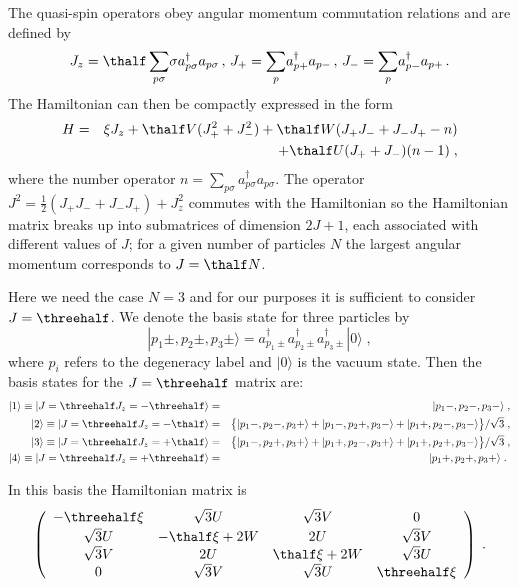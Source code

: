 The
quasi-spin operators obey angular momentum commutation relations and are
defined by
\[
J_z=\thalf\sum_{p\sigma}\!{\sigma}a^{\dagger}_{p\sigma}a_{p\sigma}\,,\,
J_+=\sum_p\!a_{p+}^{\dagger}a_{p-}\,,\,J_-=\sum_p\!a_{p-}^{\dagger}a_{p+}\,.
\]
The Hamiltonian can then be compactly expressed in the form
\begin{eqnarray}
H&=&{\xi}J_z+\thalf V(J_+^2+J_-^2)+\thalf W(J_+J_-+J_-J_+-n)\nonumber\\
&&+\thalf U(J_++J_-)(n-1)\nonumber \;,
\end{eqnarray}
where the number operator $n=\sum_{p\sigma}a^{\dagger}_{p\sigma}
a_{p\sigma}$.
The operator $J^2=\frac{1}{2}(J_+J_-+J_-J_+)+J_z^2$ commutes with the
Hamiltonian so the Hamiltonian matrix breaks up into
submatrices of dimension $2J+1$, each associated with different values of
$J$; for a given number of particles $N$ the largest angular momentum
corresponds to $J=\thalf N$. 

Here we need the case $N=3$ and for our purposes it is sufficient
to consider $J=\threehalf$.
We denote the basis state for three particles by
\[
|p_1\pm,p_2\pm,p_3\pm\rangle=a^\dagger_{p_1\pm}a^\dagger_{p_2\pm}
a^\dagger_{p_3\pm}|0\rangle\;,
\]
where $p_i$ refers to the degeneracy label and $|0\rangle$ is the 
vacuum state. Then the basis states for the $J=\threehalf$ matrix are:
\begin{eqnarray}
|1\rangle\equiv|J=\threehalf J_z=-\threehalf\rangle
&=&|p_1-,p_2-,p_3-\rangle\;,\nonumber\\
|2\rangle\equiv|J=\threehalf J_z=-\thalf\rangle
&=&\bigl\{|p_1-,p_2-,p_3+\rangle
+|p_1-,p_2+,p_3-\rangle+|p_1+,p_2-,p_3-\rangle\bigr\}/\sqrt{3}
\;,\nonumber\\
|3\rangle\equiv|J=\threehalf J_z=+\thalf\rangle
&=&\bigl\{|p_1-,p_2+,p_3+\rangle
+|p_1+,p_2-,p_3+\rangle+|p_1+,p_2+,p_3-\rangle\bigr\}/\sqrt{3}
\;,\nonumber\\
|4\rangle\equiv|J=\threehalf J_z=+\threehalf\rangle
&=&|p_1+,p_2+,p_3+\rangle\nonumber \;.\
\end{eqnarray}

In this basis the Hamiltonian matrix is 
\[
\left(\begin{array}{cccc}
-\threehalf\xi&\sqrt{3}U&\sqrt{3}V&0\\[0.5mm]
\sqrt{3}U&-\thalf\xi+2W&2U&\sqrt{3}V\\
\sqrt{3}V&2U&\thalf\xi+2W&\sqrt{3}U\\
0&\sqrt{3}V&\sqrt{3}U&\threehalf\xi
\end{array}\right)\;. \label{mat44}
\]

